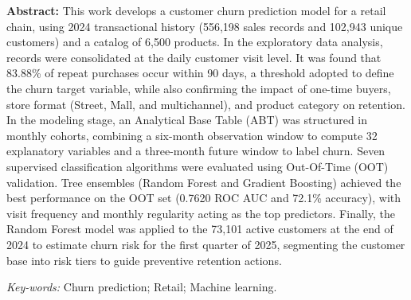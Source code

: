 \textbf{Abstract: }This work develops a customer churn prediction model for a retail chain, using 2024 transactional history (556,198 sales records and 102,943 unique customers) and a catalog of 6,500 products. 
In the exploratory data analysis, records were consolidated at the daily customer visit level. 
It was found that 83.88\% of repeat purchases occur within 90 days, a threshold adopted to define the churn target variable, while also confirming the impact of one-time buyers, store format (Street, Mall, and multichannel), and product category on retention. 
In the modeling stage, an Analytical Base Table (ABT) was structured in monthly cohorts, combining a six-month observation window to compute 32 explanatory variables and a three-month future window to label churn. 
Seven supervised classification algorithms were evaluated using Out-Of-Time (OOT) validation. Tree ensembles (Random Forest and Gradient Boosting) achieved the best performance on the OOT set (0.7620 ROC AUC and 72.1\% accuracy), with visit frequency and monthly regularity acting as the top predictors. 
Finally, the Random Forest model was applied to the 73,101 active customers at the end of 2024 to estimate churn risk for the first quarter of 2025, segmenting the customer base into risk tiers to guide preventive retention actions.

\vspace{0.5cm}
\noindent\textit{Key-words: }Churn prediction; Retail; Machine learning.